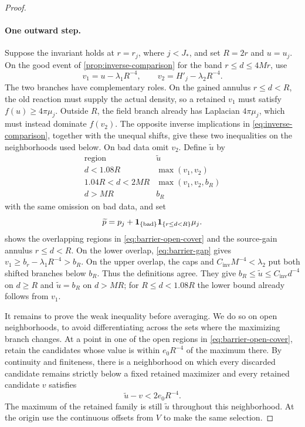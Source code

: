 \begin{proof}
\paragraph{One outward step.}
Suppose the invariant holds at $r=r_j$, where $j<J_*$, and set
$R=2r$ and $u=u_j$.  On the good event of
\cref{prop:inverse-comparison} for the band $r\le d\le4Mr$, use
\[
 v_1=u-\lambda_1R^{-4},\qquad
 v_2=H'_j-\lambda_2R^{-4}.
\]
The two branches have complementary roles.  On the gained annulus
$r\le d<R$, the old reaction must supply the actual density, so a retained
$v_1$ must satisfy $f(u)\ge4\pi\mu_j$.  Outside $R$, the field branch
already has Laplacian $4\pi\mu_j$, which must instead dominate $f(v_2)$.
The opposite inverse implications in \cref{eq:inverse-comparison},
together with the unequal shifts, give these two inequalities on the
neighborhoods used below.
On bad data omit $v_2$.  Define $\widetilde u$ by
\begin{equation}\label{eq:barrier-open-cover}
 \begin{array}{c|c}
 \text{region}&\widetilde u\\ \hline
 d<1.08R&\max(v_1,v_2)\\
 1.04R<d<2MR&\max(v_1,v_2,b_R)\\
 d>MR&b_R
 \end{array}
\end{equation}
with the same omission on bad data, and set
\begin{equation}\label{eq:barrier-added-error}
 \widetilde p=p_j+\mathbf 1_{\{\mathrm{bad}\}}\mathbf 1_{\{r\le d<R\}}\mu_j.
\end{equation}
 shows the overlapping regions in
\cref{eq:barrier-open-cover} and the source-gain annulus $r\le d<R$.
On the lower overlap, \cref{eq:barrier-gap} gives
$v_1\ge b_r-\lambda_1R^{-4}>b_R$.  On the upper overlap, the caps
and $C_{\mathrm{inv}}M^{-4}<\lambda_2$ put both shifted branches
below $b_R$.  Thus the definitions agree.  They give
$b_R\le\widetilde u\le C_{\mathrm{inv}}d^{-4}$ on $d\ge R$ and
$\widetilde u=b_R$ on $d>MR$; for $R\le d<1.08R$ the lower bound
already follows from $v_1$.



It remains to prove the weak inequality before averaging.  We do so
on open neighborhoods, to avoid differentiating across the sets
where the maximizing branch changes.  At a point in one of the
open regions in \cref{eq:barrier-open-cover}, retain the candidates
whose value is within $e_0R^{-4}$ of the maximum there.  By continuity
and finiteness, there is a neighborhood on which every discarded
candidate remains strictly below a fixed retained maximizer and
every retained candidate $v$ satisfies
\begin{equation}\label{eq:retained-branches}
 \widetilde u-v<2e_0R^{-4}.
\end{equation}
The maximum of the retained family is still $\widetilde u$ throughout
this neighborhood.  At the origin use the continuous offsets from
$V$ to make the same selection.


\end{proof}
